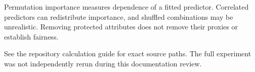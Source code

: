 \documentclass[11pt]{article}
\begin{document}
Permutation importance measures dependence of a fitted predictor. Correlated predictors can redistribute importance, and shuffled combinations may be unrealistic. Removing protected attributes does not remove their proxies or establish fairness.

See the repository calculation guide for exact source paths. The full experiment was not independently rerun during this documentation review.
\end{document}

